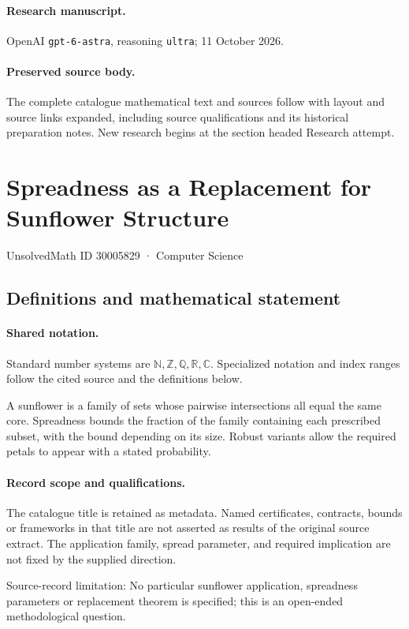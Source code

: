 \documentclass[11pt]{article}
\begin{document}
\paragraph{Research manuscript.} OpenAI \texttt{gpt-6-astra}, reasoning \texttt{ultra}; 11 October 2026.
\paragraph{Preserved source body.} The complete catalogue mathematical text and sources follow with layout and source links expanded, including source qualifications and its historical preparation notes. New research begins at the section headed Research attempt.

\section{Spreadness as a Replacement for Sunflower Structure}\label{30005829}
{\small UnsolvedMath ID 30005829 · Computer Science}
\subsection{Definitions and mathematical statement}

\paragraph{Shared notation.}Standard number systems are $\mathbb N,\mathbb Z,\mathbb Q,\mathbb R,\mathbb C$. Specialized notation and index ranges follow the cited source and the definitions below.


A sunflower is a family of sets whose pairwise intersections all equal the same core. Spreadness bounds the fraction of the family containing each prescribed subset, with the bound depending on its size. Robust variants allow the required petals to appear with a stated probability.
\paragraph{Record scope and qualifications.}
The catalogue title is retained as metadata. Named certificates, contracts, bounds or frameworks in that title are not asserted as results of the original source extract.
The application family, spread parameter, and required implication are not fixed by the supplied direction.

Source-record limitation: No particular sunflower application, spreadness parameters or replacement theorem is specified; this is an open-ended methodological question.
\end{document}
